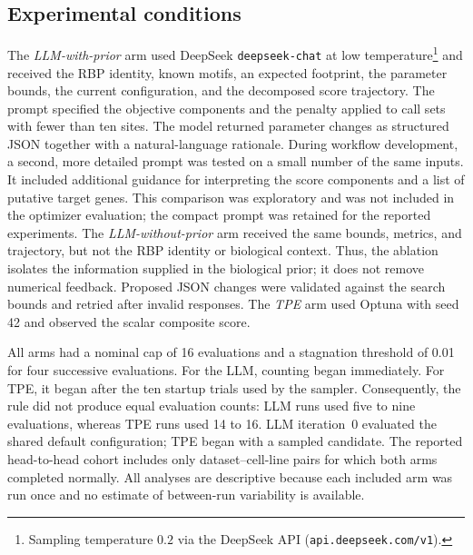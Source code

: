 \subsection{Experimental conditions}

The \emph{LLM-with-prior} arm used DeepSeek \texttt{deepseek-chat} at low
temperature\footnote{Sampling temperature $0.2$ via the DeepSeek API
(\texttt{api.deepseek.com/v1}).}
\parencite{deepseek2024} and received the RBP identity, known motifs, an expected
footprint, the parameter
bounds, the current configuration, and the decomposed score trajectory. The
prompt specified the objective components and the penalty applied to call sets
with fewer than ten sites. The model returned parameter changes as structured
JSON together with a natural-language rationale. During workflow development, a
second, more detailed prompt was tested on a small number of the same inputs. It
included additional guidance for interpreting the score components and a list of
putative target genes. This comparison was exploratory and was not included in
the optimizer evaluation; the compact prompt was retained for the reported
experiments. The
\emph{LLM-without-prior} arm received the same bounds, metrics, and trajectory,
but not the RBP identity or biological context. Thus, the ablation isolates the
information supplied in the biological prior; it does not remove numerical
feedback. Proposed JSON changes were validated against the search bounds and
retried after invalid responses. The \emph{TPE} arm used Optuna with seed 42 and
observed the scalar composite score.

All arms had a nominal cap of 16 evaluations and a stagnation threshold of 0.01
for four successive evaluations. For the LLM, counting began immediately. For
TPE, it began after the ten startup trials used by the sampler. Consequently,
the rule did not produce equal evaluation counts: LLM runs used five to nine
evaluations, whereas TPE runs used 14 to 16. LLM iteration~0 evaluated the shared
default configuration; TPE began with a sampled candidate. The reported
head-to-head cohort includes only dataset--cell-line pairs for which both arms
completed normally. All analyses are descriptive because each included arm was
run once and no estimate of between-run variability is available.
